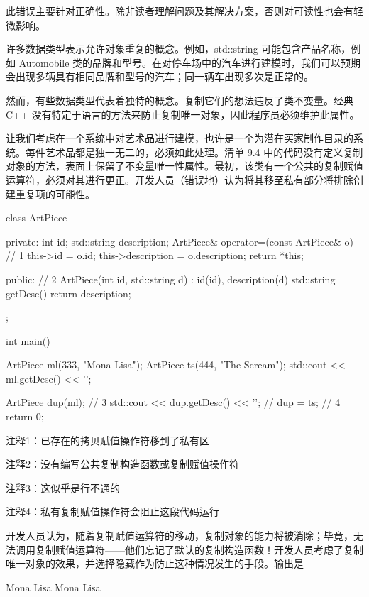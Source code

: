 此错误主要针对正确性。除非读者理解问题及其解决方案，否则对可读性也会有轻微影响。

许多数据类型表示允许对象重复的概念。例如，std::string 可能包含产品名称，例如 Automobile 类的品牌和型号。在对停车场中的汽车进行建模时，我们可以预期会出现多辆具有相同品牌和型号的汽车；同一辆车出现多次是正常的。

然而，有些数据类型代表着独特的概念。复制它们的想法违反了类不变量。经典 C++ 没有特定于语言的方法来防止复制唯一对象，因此程序员必须维护此属性。


让我们考虑在一个系统中对艺术品进行建模，也许是一个为潜在买家制作目录的系统。每件艺术品都是独一无二的，必须如此处理。清单 9.4 中的代码没有定义复制对象的方法，表面上保留了不变量唯一性属性。最初，该类有一个公共的复制赋值运算符，必须对其进行更正。开发人员（错误地）认为将其移至私有部分将排除创建重复项的可能性。


\begin{cpp}
class ArtPiece {
private:
  int id;
  std::string description;
  ArtPiece& operator=(const ArtPiece& o) { // 1
    this->id = o.id;
    this->description = o.description;
    return *this;
  }

public: // 2
  ArtPiece(int id, std::string d) : id(id), description(d) {}
  std::string getDesc() { return description; }
};

int main() {
  ArtPiece ml(333, "Mona Lisa");
  ArtPiece ts(444, "The Scream");
  std::cout << ml.getDesc() << '\n';

  ArtPiece dup(ml); // 3
  std::cout << dup.getDesc() << '\n';
  // dup = ts; // 4
  return 0;
}
\end{cpp}

{\footnotesize
注释1：已存在的拷贝赋值操作符移到了私有区

注释2：没有编写公共复制构造函数或复制赋值操作符

注释3：这似乎是行不通的

注释4：私有复制赋值操作符会阻止这段代码运行
}

开发人员认为，随着复制赋值运算符的移动，复制对象的能力将被消除；毕竟，无法调用复制赋值运算符——他们忘记了默认的复制构造函数！开发人员考虑了复制唯一对象的效果，并选择隐藏作为防止这种情况发生的手段。输出是

\begin{shell}
Mona Lisa
Mona Lisa
\end{shell}

